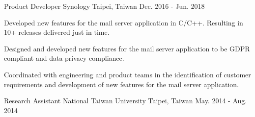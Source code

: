 \begin{cventries}
    \cventry
    {Product Developer} %
    {Synology} %
    {Taipei, Taiwan} %
    {Dec. 2016 - Jun. 2018} %
    {
        \begin{cvitems} %
        \item {Developed new features for the mail server application in C/C++. Resulting in 10+ releases delivered just in time.}
        \item {Designed and developed new features for the mail server application to be GDPR compliant and data privacy compliance.}
        \item {Coordinated with engineering and product teams in the identification of customer requirements and development of new features for the mail server application.}
        \end{cvitems}
    }

    \cventry
    {Research Assistant} %
    {National Taiwan University} %
    {Taipei, Taiwan} %
    {May. 2014 - Aug. 2014} %
    {}

\end{cventries}
